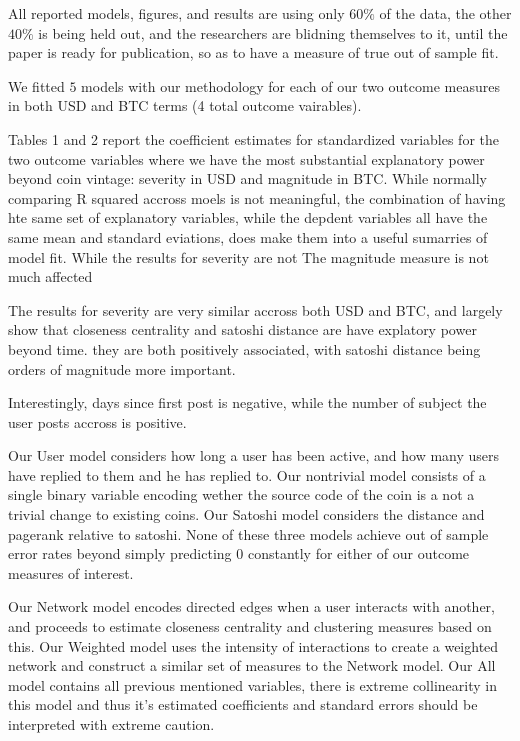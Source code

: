 All reported models, figures, and results are using only $60\%$ of the data, the other $40\%$ is being held out, and the researchers are blidning themselves to it, until the paper is ready for publication, so as to have a measure of true out of sample fit. 

We fitted $5$ models with our methodology for each of our two outcome measures in both USD and BTC terms (4 total outcome vairables).

Tables 1 and 2 report the coefficient estimates for standardized variables for the two outcome variables where we have the most substantial explanatory power beyond coin vintage: severity in USD and magnitude in BTC. While normally comparing R squared accross moels is not meaningful, the combination of having hte same set of explanatory variables, while the depdent variables all have the same mean and standard eviations, does make them into a useful sumarries of model fit. 
While the results for severity are not The magnitude measure is not much affected


The results for severity are very similar accross both USD and BTC, and largely show that closeness centrality and satoshi distance are have explatory power beyond time. they are both positively associated, with satoshi distance being orders of magnitude more important.

Interestingly, days since first post is negative, while the number of subject the user posts accross is positive.








Our User model considers how long a user has been active, and how many users have replied to them and he has replied to. 
Our nontrivial model consists of a single binary variable encoding wether the source code of the coin is a not a trivial change to existing coins. 
Our Satoshi model considers the distance and pagerank relative to satoshi.
None  of these three models achieve out of sample error rates beyond simply predicting $0$ constantly for either of our outcome measures of interest.

Our Network model encodes directed edges when a user interacts with another, and proceeds to estimate closeness centrality and clustering measures based on this. 
Our Weighted model uses the intensity of interactions to create a weighted network and construct a similar set of measures to the Network model.
Our All model contains all previous mentioned variables, there is extreme collinearity in this model and thus it's estimated coefficients and standard errors should be interpreted with extreme caution. 






